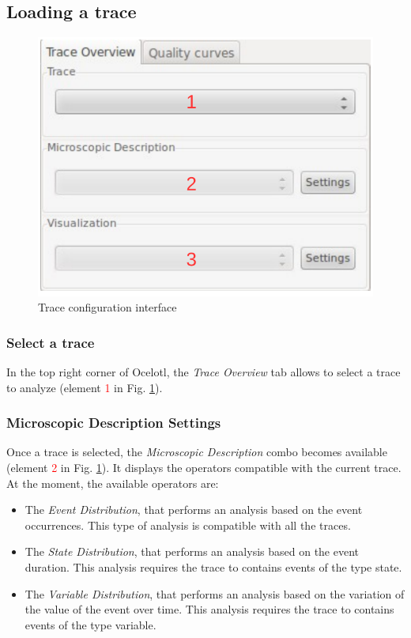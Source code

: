 \documentclass[twoside]{article}
\begin{document}
\begin{sloppypar}
\subsection{Loading a trace}
\begin{figure}[h!]
	\centering
	\includegraphics[scale=0.7]{images/traceSelection_labeled.pdf}
	\caption{Trace configuration interface}
	\label{traceConf}
\end{figure}

\subsubsection{Select a trace}

In the top right corner of Ocelotl, the \textit{Trace Overview} tab allows to select a trace to analyze (element \textcolor{red}{1} in Fig. \ref{traceConf}).

\subsubsection{Microscopic Description Settings}
Once a trace is selected, the \textit{Microscopic Description} combo becomes available (element \textcolor{red}{2} in Fig. \ref{traceConf}). It displays the operators compatible with the current trace. At the moment, the available operators are: 
\begin{itemize}
	\item The \textit{Event Distribution}, that performs an analysis based on the event occurrences. This type of analysis is compatible with all the traces.
	\item The \textit{State Distribution}, that performs an analysis based on the event duration. This analysis requires the trace to contains events of the type state.
	\item The \textit{Variable Distribution}, that performs an analysis based on the variation of the value of the event over time. This analysis requires the trace to contains events of the type variable.
\end{itemize}


\end{sloppypar}
\end{document}
